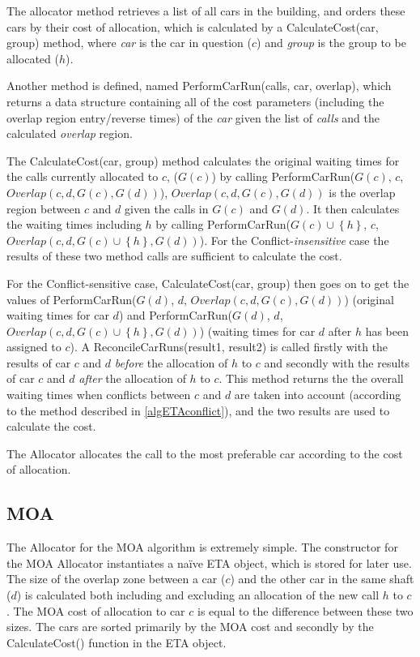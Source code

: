 \documentclass{UoYCSproject}
\begin{document}
The allocator method retrieves a list of all cars in the building, and orders these cars by their cost of allocation, which is calculated by a CalculateCost(car, group) method, where \textit{car} is the car in question ($c$) and \textit{group} is the group to be allocated ($h$).

Another method is defined, named PerformCarRun(calls, car, overlap), which returns a data structure containing all of the cost parameters (including the overlap region entry/reverse times) of the \textit{car} given the list of \textit{calls} and the calculated \textit{overlap} region.

The CalculateCost(car, group) method calculates the original waiting times for the calls currently allocated to $c$, ($G(c)$) by calling PerformCarRun($G(c)$, $c$, $Overlap(c,d,G(c),G(d))$), $Overlap(c,d,G(c),G(d))$ is the overlap region between $c$ and $d$ given the calls in $G(c)$ and $G(d)$.  It then calculates the waiting times including $h$ by calling PerformCarRun($G(c) \cup \left\{ h \right\}$, $c$, $Overlap(c,d,G(c) \cup \left\{ h \right\},G(d))$).  For the Conflict-\textit{insensitive} case the results of these two method calls are sufficient to calculate the cost.

For the Conflict-sensitive case, CalculateCost(car, group) then goes on to get the values of PerformCarRun($G(d)$, $d$, $Overlap(c,d,G(c),G(d))$) (original waiting times for car $d$) and PerformCarRun($G(d)$, $d$, $Overlap(c,d,G(c) \cup \left\{ h \right\},G(d))$) (waiting times for car $d$ after $h$ has been assigned to $c$).  A ReconcileCarRuns(result1, result2) is called firstly with the results of car $c$ and $d$ \textit{before} the allocation of $h$ to $c$ and secondly with the results of car $c$ and $d$ \textit{after} the allocation of $h$ to $c$.  This method returns the the overall waiting times when conflicts between $c$ and $d$ are taken into account (according to the method described in \ref{algETAconflict}), and the two results are used to calculate the cost.

The Allocator allocates the call to the most preferable car according to the cost of allocation.

\subsection{MOA}

The Allocator for the MOA algorithm is extremely simple.  The constructor for the MOA Allocator instantiates a na\"{i}ve ETA object, which is stored for later use.  The size of the overlap zone between a car ($c$) and the other car in the same shaft ($d$) is calculated both including and excluding an allocation of the new call $h$ to $c$.  The MOA cost of allocation to car $c$ is equal to the difference between these two sizes.  The cars are sorted primarily by the MOA cost and secondly by the CalculateCost() function in the ETA object.
\end{document}
